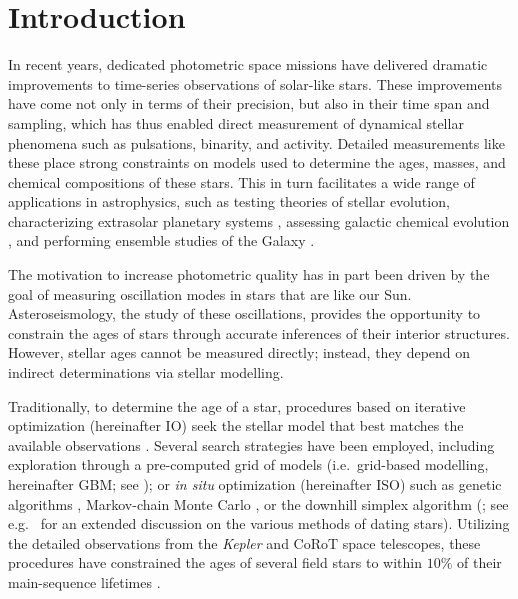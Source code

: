 \section{Introduction}

In recent years, dedicated photometric space missions have delivered dramatic improvements to time-series observations of solar-like stars. These improvements have come not only in terms of their precision, but also in their time span and sampling, which has thus enabled direct measurement of dynamical stellar phenomena such as pulsations, binarity, and activity. Detailed measurements like these place strong constraints on models used to determine the ages, masses, and chemical compositions of these stars. This in turn facilitates a wide range of applications in astrophysics, such as testing theories of stellar evolution, characterizing extrasolar planetary systems \citep[e.g.][]{2015ApJ...799..170C, 2015MNRAS.452.2127S}, assessing galactic chemical evolution \citep[e.g.][]{2015ASSP...39..111C}, and performing ensemble studies of the Galaxy \citep[e.g.][]{2011Sci...332..213C, 2013MNRAS.429..423M, 2014ApJS..210....1C}. 

The motivation to increase photometric quality has in part been driven by the goal of measuring oscillation modes in stars that are like our Sun. Asteroseismology, the study of these oscillations, provides the opportunity to constrain the ages of stars through accurate inferences of their interior structures. However, stellar ages cannot be measured directly; instead, they depend on indirect determinations via stellar modelling. 

Traditionally, to determine the age of a star, procedures based on iterative optimization (hereinafter IO) seek the stellar model that best matches the available observations \citep{1994ApJ...427.1013B}. 
Several search strategies have been employed, including exploration through a pre-computed grid of models (i.e.\ grid-based modelling, hereinafter GBM; see \citealt{2011ApJ...730...63G, 2014ApJS..210....1C}); or \emph{in situ} optimization (hereinafter ISO) such as genetic algorithms \citep{2014ApJS..214...27M}, Markov-chain Monte Carlo \citep{2012MNRAS.427.1847B}, or the downhill simplex algorithm (\citealt{2013apjs..208....4p}; see e.g.\ \citealt{2015MNRAS.452.2127S} for an extended discussion on the various methods of dating stars). Utilizing the detailed observations from the \emph{Kepler} and CoRoT space telescopes, these procedures have constrained the ages of several field stars to within $10\%$ of their main-sequence lifetimes \citep{2015MNRAS.452.2127S}. 

